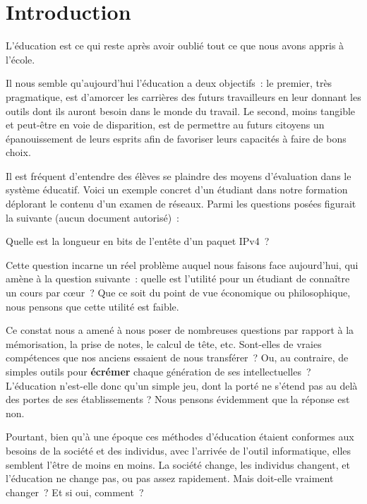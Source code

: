 
\chapter*{Introduction}\label{intro}

\begin{coolquote}
L'éducation est ce qui reste après avoir oublié tout ce que nous avons appris à l'école. 
\end{coolquote}

Il nous semble qu'aujourd'hui l'éducation a deux objectifs~: le premier, très pragmatique, est d’amorcer les carrières des futurs travailleurs en leur donnant les outils dont ils auront besoin dans le monde du travail. Le second, moins tangible et peut-être en voie de disparition, est de permettre au futurs citoyens un épanouissement de leurs esprits afin de favoriser leurs capacités à \og{}faire de bons choix\fg{}.

Il est fréquent d'entendre des élèves se plaindre des moyens d'évaluation dans le système éducatif. Voici un exemple concret d'un étudiant dans notre formation déplorant le contenu d'un examen de réseaux. Parmi les questions posées figurait la suivante (aucun document autorisé)~:

\begin{coolquote}Quelle est la
  longueur en bits de l'entête d'un paquet IPv4~?\end{coolquote}

Cette question incarne un réel problème auquel nous faisons face
aujourd'hui, qui amène à la question suivante~: quelle est l'utilité
pour un étudiant de connaître un cours par c\oe{}ur~? Que ce soit du
point de vue économique ou philosophique, nous pensons que cette
utilité est faible.

Ce constat nous a amené à nous poser de nombreuses questions par rapport à la mémorisation, la prise de notes, le calcul de tête, etc. Sont-elles de vraies compétences que nos anciens essaient de nous transférer~? Ou, au contraire, de simples outils pour \textbf{écrémer} chaque génération de ses intellectuelles~? L'éducation n'est-elle donc qu'un simple jeu, dont la porté ne s'étend pas au delà des portes de ses établissements ? Nous pensons évidemment que la réponse est non.

Pourtant, bien qu'à une époque ces méthodes d'éducation étaient conformes aux besoins de la société et des individus, avec l'arrivée de l'outil informatique, elles semblent l'être de moins en moins. La société change, les individus changent, et l'éducation ne change pas, ou pas assez rapidement. Mais doit-elle vraiment changer~? Et si oui, comment~?

